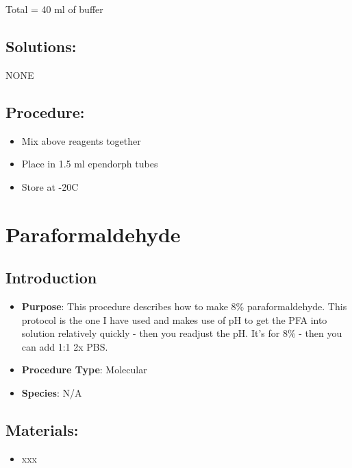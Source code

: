 \documentclass[
  letterpaper,
  DIV=11,
  numbers=noendperiod]{scrreprt}
\providecommand{\tightlist}{%
  \setlength{\itemsep}{0pt}\setlength{\parskip}{0pt}}\usepackage{longtable,booktabs,array}
\begin{document}
Total = 40 ml of buffer

\hypertarget{solutions-2}{%
\section{Solutions:}\label{solutions-2}}

NONE

\hypertarget{procedure-2}{%
\section{Procedure:}\label{procedure-2}}

\begin{itemize}
\tightlist
\item
  Mix above reagents together
\item
  Place in 1.5 ml ependorph tubes
\item
  Store at -20C
\end{itemize}

\hypertarget{sec-molec-para}{%
\chapter{Paraformaldehyde}\label{sec-molec-para}}

\hypertarget{introduction-3}{%
\section{Introduction}\label{introduction-3}}

\begin{itemize}
\tightlist
\item
  \textbf{Purpose}: This procedure describes how to make 8\%
  paraformaldehyde. This protocol is the one I have used and makes use
  of pH to get the PFA into solution relatively quickly - then you
  readjust the pH. It's for 8\% - then you can add 1:1 2x PBS.
\item
  \textbf{Procedure Type}: Molecular
\item
  \textbf{Species}: N/A
\end{itemize}

\hypertarget{materials-3}{%
\section{Materials:}\label{materials-3}}

\begin{itemize}
\tightlist
\item
  xxx
\end{itemize}
\end{document}
